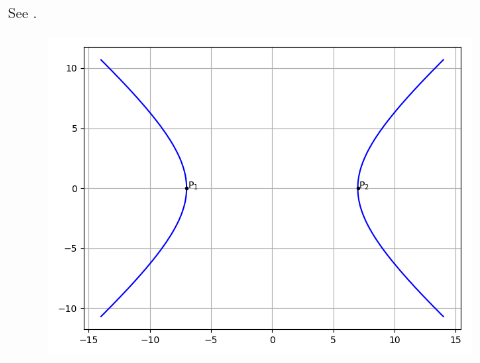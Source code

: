 See .
    \begin{figure}[!ht]
        \centering
        \includegraphics[width=\columnwidth]{chapters/11/11/4/14/figs/hyperbola.png}
        \caption{}
        \label{fig:chapters/11/11/4/14/hyperbola}
    \end{figure}
